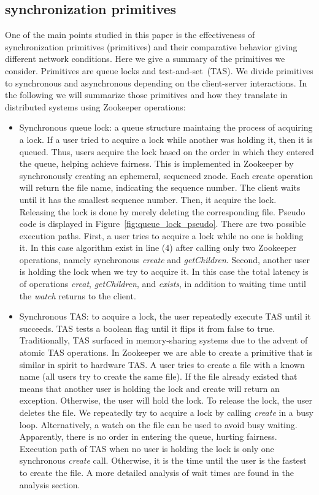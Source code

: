 \subsection{synchronization primitives}

One of the main points studied in this paper is the effectiveness of synchronization primitives (primitives) and their comparative behavior giving different network conditions. Here we give a summary of the primitives we consider. Primitives are queue locks and test-and-set~(TAS). We divide primitives to synchronous and asynchronous depending on the client-server interactions. In the following we will summarize those primitives and how they translate in distributed systems using Zookeeper operations:
\begin{itemize}
\item{Synchronous queue lock: a queue structure maintaing the process of acquiring a lock. If a user tried to acquire a lock while another was holding it, then it is queued. Thus, users acquire the lock based on the order in which they entered the queue, helping achieve fairness. This is implemented in Zookeeper by synchronously creating an ephemeral, sequenced znode. Each create operation will return the file name, indicating the sequence number. The client waits until it has the smallest sequence number. Then, it acquire the lock. Releasing the lock is done by merely deleting the corresponding file. Pseudo code is displayed in Figure~\ref{fig:queue_lock_pseudo}. There are two possible execution paths. First, a user tries to acquire a lock while no one is holding it. In this case algorithm exist in line (4) after calling only two Zookeeper operations, namely synchronous \emph{create} and \emph{getChildren}. Second, another user is holding the lock when we try to acquire it. In this case the total latency is of operations \emph{creat}, \emph{getChildren}, and \emph{exists}, in addition to waiting time until the \emph{watch} returns to the client.}
\item{Synchronous TAS: to acquire a lock, the user repeatedly execute TAS until it succeeds. TAS tests a boolean flag until it flips it from false to true. Traditionally, TAS surfaced in memory-sharing systems due to the advent of atomic TAS operations. In Zookeeper we are able to create a primitive that is similar in spirit to hardware TAS. A user tries to create a file with a known name (all users try to create the same file). If the file already existed that means that another user is holding the lock and create will return an exception. Otherwise, the user will hold the lock. To release the lock, the user deletes the file. We repeatedly try to acquire a lock by calling \emph{create} in a busy loop. Alternatively, a watch on the file can be used to avoid busy waiting. Apparently, there is no order in entering the queue, hurting fairness. Execution path of TAS when no user is holding the lock is only one synchronous \emph{create} call. Otherwise, it is the time until the user is the fastest to create the file. A more detailed analysis of wait times are found in the analysis section. }

\end{itemize}
